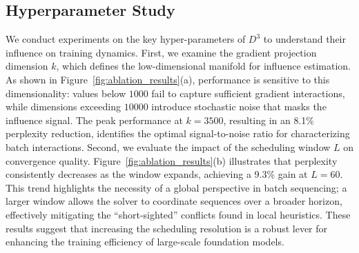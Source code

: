 \subsection{Hyperparameter Study}
We conduct experiments on the key hyper-parameters of $D^3$ to understand their influence on training dynamics. First, we examine the gradient projection dimension $k$, which defines the low-dimensional manifold for influence estimation. As shown in Figure~\ref{fig:ablation_results}(a), performance is sensitive to this dimensionality: values below $1000$ fail to capture sufficient gradient interactions, while dimensions exceeding $10000$ introduce stochastic noise that masks the influence signal. The peak performance at $k = 3500$, resulting in an 8.1\% perplexity reduction, identifies the optimal signal-to-noise ratio for characterizing batch interactions. Second, we evaluate the impact of the scheduling window $L$ on convergence quality. Figure~\ref{fig:ablation_results}(b) illustrates that perplexity consistently decreases as the window expands, achieving a 9.3\% gain at $L=60$. This trend highlights the necessity of a global perspective in batch sequencing; a larger window allows the solver to coordinate sequences over a broader horizon, effectively mitigating the ``short-sighted'' conflicts found in local heuristics. These results suggest that increasing the scheduling resolution is a robust lever for enhancing the training efficiency of large-scale foundation models.



